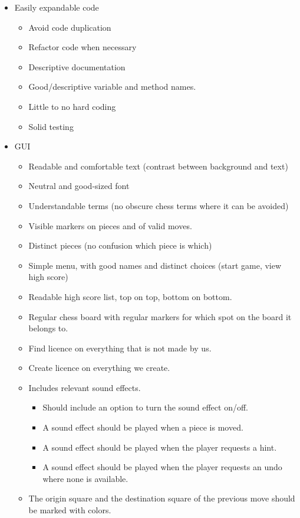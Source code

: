 \documentclass{article}
\begin{document}
\begin{itemize}
	\item Easily expandable code
	\begin{itemize}
		\item Avoid code duplication
		\item Refactor code when necessary 
		\item Descriptive documentation
		\item Good/descriptive variable and method names.
		\item Little to no hard coding
		\item Solid testing
	\end{itemize}
	\item GUI
	\begin{itemize}
		\item Readable and comfortable text (contrast between background and text)
		\item Neutral and good-sized font
		\item Understandable terms (no obscure chess terms where it can be avoided)
		\item Visible markers on pieces and of valid moves.
		\item Distinct pieces (no confusion which piece is which)
		\item Simple menu, with good names and distinct choices (start game, view high score)
		\item Readable high score list, top on top, bottom on bottom.
		\item Regular chess board with regular markers for which spot on the board it belongs to.
		\item Find licence on everything that is not made by us.
		\item Create licence on everything we create.
		\item Includes relevant sound effects.
		\begin{itemize}
			\item Should include an option to turn the sound effect on/off.
			\item  A sound effect should be played when a piece is moved. 
			\item A sound effect should be played when the player requests a hint.
			\item A sound effect should be played when the player requests an undo where none is available.
		\end{itemize}
		\item The origin square and the destination square of the previous move should be marked with colors.

\end{itemize}
\end{itemize}
\end{document}
